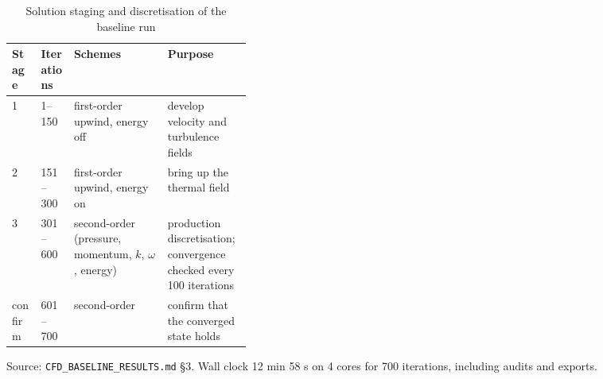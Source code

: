 \begin{table}[htbp]
\centering
\footnotesize
\caption{Solution staging and discretisation of the baseline run}
\label{tab:stages}
\begin{tabular}{lllp{0.35\linewidth}}
\toprule
Stage & Iterations & Schemes & Purpose \\
\midrule
1 & 1--150 & first-order upwind, energy off & develop velocity and turbulence fields \\
2 & 151--300 & first-order upwind, energy on & bring up the thermal field \\
3 & 301--600 & second-order (pressure, momentum, $k$, $\omega$, energy) & production discretisation; convergence checked every 100 iterations \\
confirm & 601--700 & second-order & confirm that the converged state holds \\
\bottomrule
\end{tabular}
\par\smallskip\parbox{\linewidth}{\footnotesize\raggedright Source: \texttt{CFD\_BASELINE\_RESULTS.md} \S3. Wall clock 12 min 58 s on 4 cores for 700 iterations, including audits and exports.}
\end{table}
